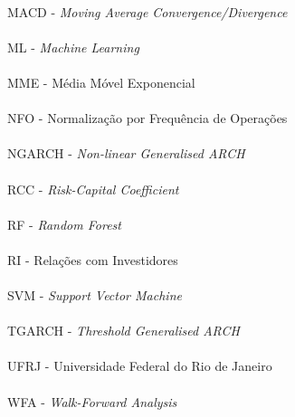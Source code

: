 \paragraph{}MACD - \textit{Moving Average Convergence/Divergence}
\paragraph{}ML - \textit{Machine Learning}
\paragraph{}MME - Média Móvel Exponencial
\paragraph{}NFO - Normalização por Frequência de Operações
\paragraph{}NGARCH - \textit{Non-linear Generalised ARCH}
\paragraph{}RCC - \textit{Risk-Capital Coefficient}
\paragraph{}RF - \textit{Random Forest}
\paragraph{}RI - Relações com Investidores
\paragraph{}SVM - \textit{Support Vector Machine}
\paragraph{}TGARCH - \textit{Threshold Generalised ARCH}
\paragraph{}UFRJ - Universidade Federal do Rio de Janeiro
\paragraph{}WFA - \textit{Walk-Forward Analysis}

\pagebreak